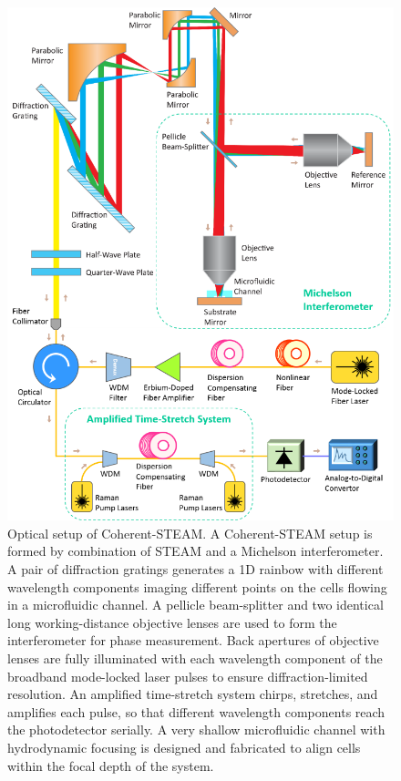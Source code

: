 \begin{figure}[htb!]
\centering
\includegraphics[scale=0.67]{BOE2013/Figure1.png}
\caption{Optical setup of Coherent-STEAM. A Coherent-STEAM setup is formed by combination of STEAM and a Michelson interferometer. A pair of diffraction gratings generates a 1D rainbow with different wavelength components imaging different points on the cells flowing in a microfluidic channel. A pellicle beam-splitter and two identical long working-distance objective lenses are used to form the interferometer for phase measurement. Back apertures of objective lenses are fully illuminated with each wavelength component of the broadband mode-locked laser pulses to ensure diffraction-limited resolution. An amplified time-stretch system chirps, stretches, and amplifies each pulse, so that different wavelength components reach the photodetector serially. A very shallow microfluidic channel with hydrodynamic focusing is designed and fabricated to align cells within the focal depth of the system.}
\label{fig:BOE2013_Figure1}
\end{figure}

